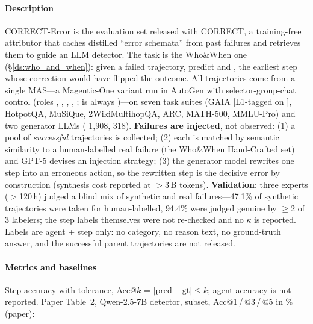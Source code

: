 \paragraph{Description} CORRECT-Error is the evaluation set released with CORRECT, a training-free attributor that caches distilled ``error schemata'' from past failures and retrieves them to guide an LLM detector. The task is the Who\&When one (\S\ref{ds:who_and_when}): given a failed trajectory, predict  and , the earliest step whose correction would have flipped the outcome. All trajectories come from a single MAS---a Magentic-One variant run in AutoGen with selector-group-chat control (roles , , , , ;  is always )---on seven task suites (GAIA [L1-tagged on ], HotpotQA, MuSiQue, 2WikiMultihopQA, ARC, MATH-500, MMLU-Pro) and two generator LLMs ( 1,908,  318). \textbf{Failures are injected}, not observed: (1) a pool of \emph{successful} trajectories is collected; (2) each is matched by semantic similarity to a human-labelled real failure (the Who\&When Hand-Crafted set) and GPT-5 devises an injection strategy; (3) the generator model rewrites one step into an erroneous action, so the rewritten step is the decisive error by construction (synthesis cost reported at $>$3\,B tokens). \textbf{Validation}: three experts ($>$120\,h) judged a blind mix of synthetic and real failures---47.1\% of synthetic trajectories were taken for human-labelled, 94.4\% were judged genuine by $\ge$2 of 3 labelers; the step labels themselves were not re-checked and no $\kappa$ is reported. Labels are agent + step only: no category, no reason text, no ground-truth answer, and the successful parent trajectories are not released.

\paragraph{Metrics and baselines} Step accuracy with tolerance, Acc@$k$ = $|\text{pred}-\text{gt}|\le k$; agent accuracy is not reported. Paper Table~2, Qwen-2.5-7B detector,  subset, Acc@1\,/\,@3\,/\,@5 in \% (paper):

